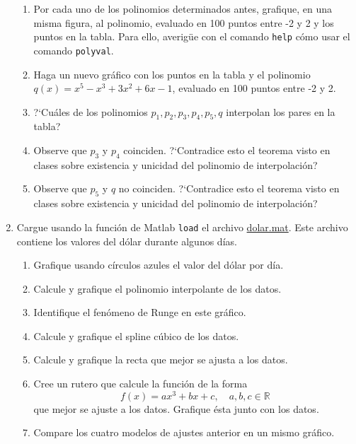 \documentclass[letterpaper,11pt]{article}
\newcommand{\matlab}{{\sc Matlab} }
\begin{document}
\begin{enumerate}
\begin{enumerate}
\item Por cada uno de los polinomios determinados antes, grafique, en una misma
figura, al polinomio, evaluado en 100 puntos entre -2 y 2 y los puntos en la tabla. Para ello, averig\"ue con el comando \verb"help" c\'omo usar el comando \verb"polyval".

\item Haga un nuevo gr\'afico con los puntos en la tabla y el polinomio
$q(x) = x^5 -x^3 +3x^2 + 6x -1$, evaluado en 100 puntos
entre -2 y 2.

\item?`Cu\'ales de los polinomios $p_1, p_2, p_3, p_4, p_5, q$ interpolan los pares en la tabla?

\item Observe que $p_3$ y $p_4$ coinciden. ?`Contradice esto el teorema visto en clases sobre
existencia y unicidad del polinomio de interpolaci\'on?

\item Observe que $p_5$ y $q$ no coinciden. ?`Contradice esto
el teorema visto en clases sobre existencia y unicidad del
polinomio de interpolaci\'on?
			
	\end{enumerate}
            
\item Cargue usando la funci\'on de \matlab \texttt{load} el archivo 
\href{ftp://ftp.ing-mat.udec.cl/pub/ing-mat/asignaturas/521230/ejercicios/2018-1/dolar.mat}{dolar.mat}.
Este archivo contiene los valores del d\'olar durante algunos d\'ias. 

\begin{enumerate}
\item Grafique usando c\'irculos azules el valor del d\'olar por d\'ia.
\item Calcule y grafique el polinomio interpolante de los datos.
\item Identifique el fen\'omeno de Runge en este gr\'afico.
\item Calcule y grafique el spline c\'ubico de los datos.
\item Calcule y grafique la recta que mejor se ajusta a los datos.
\item Cree un rutero que calcule la funci\'on de la forma 
$$
f(x)=ax^3+bx+c, \quad a,b,c\in\mathbb{R}
$$
que mejor se ajuste a los datos. Grafique \'esta junto con los datos.
\item Compare los cuatro modelos de ajustes anterior en un mismo gr\'afico.
\end{enumerate}


\end{enumerate}
\end{document}
